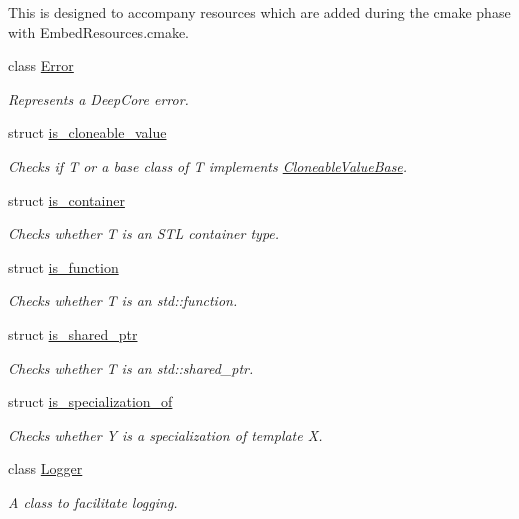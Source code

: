 \begin{DoxyCompactItemize}
\begin{DoxyCompactList}
This is designed to accompany resources which are added during the cmake phase with Embed\+Resources.\+cmake. \end{DoxyCompactList}\item 
class \hyperlink{classdg_1_1deepcore_1_1_error}{Error}
\begin{DoxyCompactList}\small\item\em Represents a Deep\+Core error. \end{DoxyCompactList}\item 
struct \hyperlink{structdg_1_1deepcore_1_1is__cloneable__value}{is\+\_\+cloneable\+\_\+value}
\begin{DoxyCompactList}\small\item\em Checks if {\ttfamily T} or a base class of {\ttfamily T} implements \hyperlink{structdg_1_1deepcore_1_1_cloneable_value_base}{Cloneable\+Value\+Base}. \end{DoxyCompactList}\item 
struct \hyperlink{structdg_1_1deepcore_1_1is__container}{is\+\_\+container}
\begin{DoxyCompactList}\small\item\em Checks whether {\ttfamily T} is an S\+TL container type. \end{DoxyCompactList}\item 
struct \hyperlink{structdg_1_1deepcore_1_1is__function}{is\+\_\+function}
\begin{DoxyCompactList}\small\item\em Checks whether T is an {\ttfamily std\+::function}. \end{DoxyCompactList}\item 
struct \hyperlink{structdg_1_1deepcore_1_1is__shared__ptr}{is\+\_\+shared\+\_\+ptr}
\begin{DoxyCompactList}\small\item\em Checks whether T is an {\ttfamily std\+::shared\+\_\+ptr}. \end{DoxyCompactList}\item 
struct \hyperlink{structdg_1_1deepcore_1_1is__specialization__of}{is\+\_\+specialization\+\_\+of}
\begin{DoxyCompactList}\small\item\em Checks whether {\ttfamily Y} is a specialization of template {\ttfamily X}. \end{DoxyCompactList}\item 
class \hyperlink{classdg_1_1deepcore_1_1_logger}{Logger}
\begin{DoxyCompactList}\small\item\em A class to facilitate logging. \end{DoxyCompactList}\item 

\end{DoxyCompactItemize}
